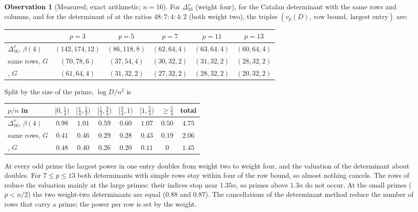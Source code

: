 \documentclass[11pt]{article}
\theoremstyle{definition}
\newtheorem{observation}[theorem]{Observation}
\begin{document}
\begin{observation}[Measured; exact arithmetic; $n=16$]\label{obs:weightlaw}
For $\Delta^\nu_{16}$ (weight four), for the Catalan determinant with the same rows and columns, and for the determinant of \cite{OAI} at the ratios $48:7:4:4:2$ (both weight two), the triples $(v_p(D),\ \text{row bound},\ \text{largest entry})$ are:
\begin{center}
\small
\begin{tabular}{lccccc}
\toprule
& $p=3$ & $p=5$ & $p=7$ & $p=11$ & $p=13$\\
\midrule
$\Delta^\nu_{16}$, $\beta(4)$ & $(142,174,12)$ & $(86,118,8)$ & $(62,64,4)$ & $(63,64,4)$ & $(60,64,4)$\\
same rows, $G$ & $(70,78,6)$ & $(37,54,4)$ & $(30,32,2)$ & $(31,32,2)$ & $(28,32,2)$\\
\cite{OAI}, $G$ & $(61,64,4)$ & $(31,32,2)$ & $(27,32,2)$ & $(28,32,2)$ & $(20,32,2)$\\
\bottomrule
\end{tabular}
\end{center}
Split by the size of the prime, $\log D/n^2$ is
\begin{center}
\small
\begin{tabular}{lccccccc}
\toprule
$p/n$ in & $[0,\frac14)$ & $[\frac14,\frac12)$ & $[\frac12,\frac34)$ & $[\frac34,1)$ & $[1,\frac54)$ & $\ge\frac54$ & total\\
\midrule
$\Delta^\nu_{16}$, $\beta(4)$ & $0.98$ & $1.01$ & $0.59$ & $0.60$ & $1.07$ & $0.50$ & $4.75$\\
same rows, $G$ & $0.41$ & $0.46$ & $0.29$ & $0.28$ & $0.43$ & $0.19$ & $2.06$\\
\cite{OAI}, $G$ & $0.48$ & $0.40$ & $0.26$ & $0.20$ & $0.11$ & $0$ & $1.45$\\
\bottomrule
\end{tabular}
\end{center}
\end{observation}

At every odd prime the largest power in one entry doubles from weight two to weight four, and the valuation of the determinant about doubles. For $7\le p\le13$ both determinants with simple rows stay within four of the row bound, so almost nothing cancels. The rows of \cite{OAI} reduce the valuation mainly at the large primes: their indices stop near $1.35n$, so primes above $1.3n$ do not occur. At the small primes ($p<n/2$) the two weight-two determinants are equal ($0.88$ and $0.87$). The cancellations of the determinant method reduce the number of rows that carry a prime; the power per row is set by the weight.
\end{document}
